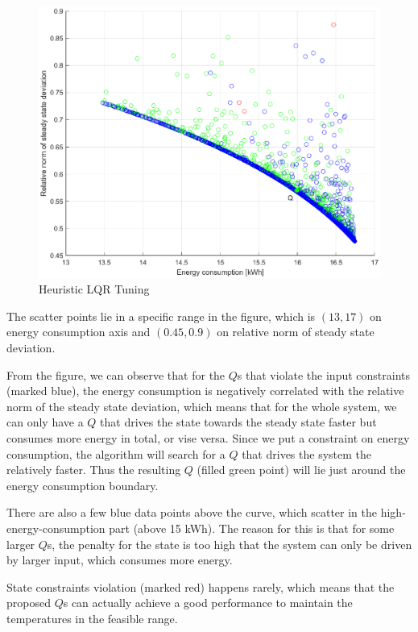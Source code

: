 \documentclass[a4paper,twoside,11pt]{article}
\numberwithin{equation}{section}
\begin{document}
\begin{figure}[ht]
\centering
\includegraphics[scale = 0.7]{image/6.eps}
\caption{Heuristic LQR Tuning}
\label{fig:2}
\end{figure}

The scatter points lie in a specific range in the figure, which is $(13, 17)$ on energy consumption axis and $(0.45, 0.9)$ on relative norm of steady state deviation. 

From the figure, we can observe that for the $Q$s that violate the input constraints (marked blue), the energy consumption is negatively correlated with the relative norm of the steady state deviation, which means that for the whole system, we can only have a $Q$ that drives the state towards the steady state faster but consumes more energy in total, or vise versa. Since we put a constraint on energy consumption, the algorithm will search for a $Q$ that drives the system the relatively faster. Thus the resulting $Q$ (filled green point) will lie just around the energy consumption boundary. 

There are also a few blue data points above the curve, which scatter in the high-energy-consumption part (above 15 kWh). The reason for this is that for some larger $Q$s, the penalty for the state is too high that the system can only be driven by larger input, which consumes more energy. 

State constraints violation (marked red) happens rarely, which means that the proposed $Q$s can actually achieve a good performance to maintain the temperatures in the feasible range.
\end{document}

